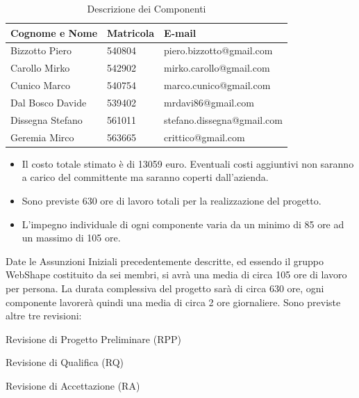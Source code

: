 \begin{table}[h]
	\begin{center}
		  \begin{tabular}{|p{}|l|l|}
		 \hline 
		 \textbf{Cognome e Nome} & \textbf{Matricola} & \textbf{E-mail}\\
		 \hline
		Bizzotto Piero & 540804 & piero.bizzotto@gmail.com \\
		\hline
		Carollo Mirko & 542902 & mirko.carollo@gmail.com\\
		\hline
		Cunico Marco & 540754 & marco.cunico@gmail.com\\
		\hline
		Dal Bosco Davide & 539402 & mrdavi86@gmail.com\\
		\hline
		Dissegna Stefano & 561011 & stefano.dissegna@gmail.com \\
		\hline
		Geremia Mirco & 563665 & crittico@gmail.com\\
		\hline
		\end{tabular}
	\caption{Descrizione dei Componenti} 
	\label{tab:tabella_componenti}
	\end{center}	
\end{table}


\begin{itemize}
\item Il costo totale stimato \`e di 13059 euro. Eventuali costi aggiuntivi non saranno a carico del committente ma saranno coperti dall'azienda.
\item Sono previste 630 ore di lavoro totali per la realizzazione del progetto.
\item L'impegno individuale di ogni componente varia da un minimo di 85 ore ad un massimo di 105 ore.
\end{itemize}


Date le Assunzioni Iniziali precedentemente descritte, ed essendo il gruppo WebShape costituito da sei membri, si avr\`a una media di circa 105 ore di lavoro per persona. La durata complessiva del progetto sar\`a di circa 630 ore, ogni componente lavorer\`a quindi una media di circa 2 ore giornaliere. Sono previste altre tre revisioni:
\begin{elenconumerato}{\normindent}
				\item Revisione di Progetto Preliminare (RPP)
				\item Revisione di Qualifica (RQ)
				\item Revisione di Accettazione (RA)
			\end{elenconumerato}

